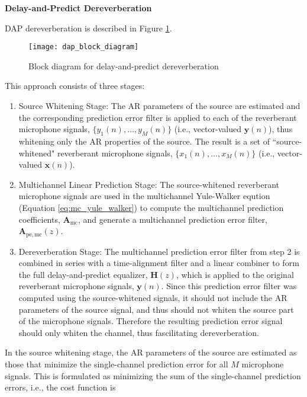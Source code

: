 \noindent
\newline
\textbf{Delay-and-Predict Dereverberation}

\noindent
DAP dereverberation is described in Figure \ref{fig:dap_block_diagram}. 

\begin{figure}[H]
	\texttt{[image: dap\_block\_diagram]}
	\centering
	\caption[Block diagram for delay-and-predict dereverberation]{Block diagram for delay-and-predict dereverberation}
	\label{fig:dap_block_diagram}
\end{figure}


This approach consists of three stages:

\begin{enumerate}
	\item Source Whitening Stage: The AR parameters of the source are estimated and the corresponding prediction error filter is applied to each of the reverberant microphone signals, $\{y_1(n), \dots, y_M(n)\}$ (i.e., vector-valued $\boldsymbol{y}(n)$), thus whitening only the AR properties of the source. The result is a set of ``source-whitened" reverberant microphone signals, $\{x_1(n), \dots, x_M(n)\}$ (i.e., vector-valued $\boldsymbol{x}(n)$).
	\item Multichannel Linear Prediction Stage: The source-whitened reverberant microphone signals are used in the multichannel Yule-Walker eqution (Equation \ref{eq:mc_yule_walker}) to compute the multichannel prediction coefficients, $\boldsymbol{A}_{\mathrm{mc}}$, and generate a multichannel prediction error filter, $\boldsymbol{A}_{\mathrm{pe,mc}}(z)$.
	\item Dereverberation Stage: The multichannel prediction error filter from step 2 is combined in series with a time-alignment filter and a linear combiner to form the full delay-and-predict equalizer, $\boldsymbol{H}(z)$, which is applied to the original reverberant microphone signals, $\boldsymbol{y}(n)$. Since this prediction error filter was computed using the source-whitened signals, it should not include the AR parameters of the source signal, and thus should not whiten the source part of the microphone signals. Therefore the resulting prediction error signal should only whiten the channel, thus fascilitating dereverberation.
\end{enumerate}

In the source whitening stage, the AR parameters of the source are estimated as those that minimize the single-channel prediction error for all $M$ microphone signals. This is formulated as minimizing the sum of the single-channel prediction errors, i.e., the cost function is

